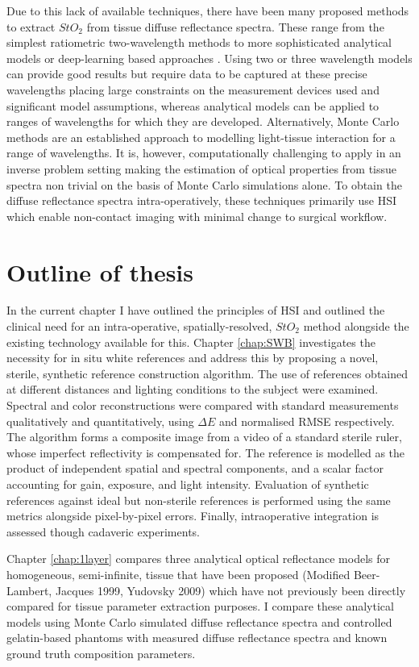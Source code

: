 Due to this lack of available techniques, there have been many proposed methods to extract $StO_2$ from tissue diffuse reflectance spectra. These range from the simplest ratiometric two-wavelength methods to more sophisticated analytical models \cite{MacKenzie2018} or deep-learning based approaches \cite{Ayala2023}. Using two or three wavelength models can provide good results but require data to be captured at these precise wavelengths placing large constraints on the measurement devices used and significant model assumptions, whereas analytical models can be applied to ranges of wavelengths for which they are developed. Alternatively, Monte Carlo methods are an established approach to modelling light-tissue interaction for a range of wavelengths. It is, however, computationally challenging to apply in an inverse problem setting making the estimation of optical properties from tissue spectra non trivial on the basis of Monte Carlo simulations alone. To obtain the diffuse reflectance spectra intra-operatively, these techniques primarily use HSI which enable non-contact imaging with minimal change to surgical workflow. 

\section{Outline of thesis}
In the current chapter I have outlined the principles of HSI and outlined the clinical need for an intra-operative, spatially-resolved, $StO_2$ method alongside the existing technology available for this. 
Chapter \ref{chap:SWB} investigates the necessity for in situ white references and address this by proposing a novel, sterile, synthetic reference construction algorithm. The use of references obtained at different distances and lighting conditions to the subject were examined. Spectral and color reconstructions were compared with standard measurements qualitatively and quantitatively, using $\Delta E$ and normalised RMSE respectively. The algorithm forms a composite image from a video of a standard sterile ruler, whose imperfect reflectivity is compensated for. The reference is modelled as the product of independent spatial and spectral components, and a scalar factor accounting for gain, exposure, and light intensity. Evaluation of synthetic references against ideal but non-sterile references is performed using the same metrics alongside pixel-by-pixel errors. Finally, intraoperative integration is assessed though cadaveric experiments.

Chapter \ref{chap:1layer} compares three analytical optical reflectance models for homogeneous, semi-infinite, tissue that have been proposed (Modified Beer-Lambert\cite{Clancy2015}, Jacques 1999\cite{Jacques1999}, Yudovsky 2009\cite{Yudovsky2009}) which have not previously been directly compared for tissue parameter extraction purposes. I compare these analytical models using Monte Carlo simulated diffuse reflectance spectra and controlled gelatin-based phantoms with measured diffuse reflectance spectra and known ground truth composition parameters. 

